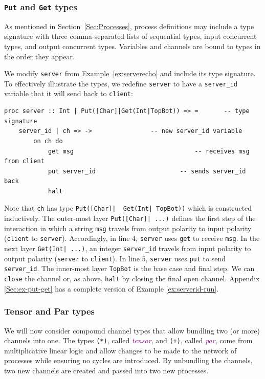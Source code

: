 \documentclass[11pt]{article}
\newcommand{\tc}[1]{\textcolor{darkMagenta}{\textit{#1}}}
\begin{document}
\subsubsection{\lstinline$Put$ and \lstinline$Get$ types}
\label{Sec:putandget}

As mentioned in Section~\ref{Sec:Processes}, process definitions may include a type signature with three comma-separated lists of sequential types, input concurrent types, and output concurrent types.
Variables and channels are bound to types in the order they appear.

We modify \lstinline$server$ from Example~\ref{ex:serverecho} and include its type signature.
To effectively illustrate the types, we redefine \lstinline$server$ to have a \lstinline$server_id$ variable that it will send back to  \lstinline$client$:
\begin{lstlisting}[label=ex:serverid-run, caption=Server replies to Client with server id]
proc server :: Int | Put([Char]|Get(Int|TopBot)) => =		-- type signature
	server_id | ch => ->				-- new server_id variable
		on ch do
			get msg									-- receives msg from client
			put server_id						-- sends server_id back
			halt
\end{lstlisting}
Note that \lstinline$ch$ has type \lstinline$Put([Char]|  Get(Int| TopBot))$ which is constructed inductively. 
The outer-most layer \lstinline$Put([Char]| ...)$ defines the first step of the interaction in which a string \lstinline$msg$ travels from output polarity to input polarity (\lstinline$client$ to \lstinline$server$). Accordingly, in line 4, \lstinline$server$ uses \lstinline$get$ to receive \lstinline$msg$. 
In the next layer \lstinline$Get(Int| ...)$, an integer \lstinline$server_id$ travels from input polarity to output polarity (\lstinline$server$ to \lstinline$client$).
In line 5, \lstinline$server$ uses \lstinline$put$ to send \lstinline$server_id$.
The inner-most layer \lstinline$TopBot$ is the base case and final step. 
We can \lstinline$close$ the channel or, as above, \lstinline$halt$ by closing the final open channel.
Appendix \ref{Sec:ex-put-get} has a complete version of Example \ref{ex:serverid-run}.

\subsubsection{Tensor and Par types}
\label{Sec:tensorandpar}

We will now consider compound channel types that allow bundling two (or more) channels into one.
The types \lstinline$(*)$, called \tc{tensor}, and \lstinline$(+)$, called \tc{par}, come from multiplicative linear logic and allow changes to be made to the network of processes while ensuring no cycles are introduced.
By unbundling the channels, two new channels are created and passed into two new processes.
\end{document}
